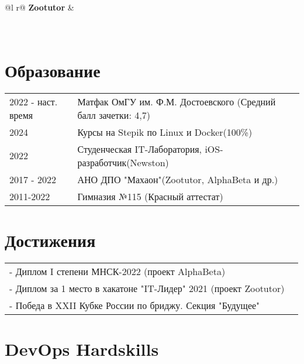 \documentclass[a4paper,12pt]{article}
\begin{document}
\begin{tabularx}{\linewidth}{ @{}l r@{} }
{\textbf{Zootutor}} & \hfill \\[3.75pt]
 \\\\
\end{tabularx}

\section{Образование}
\begin{tabularx}{\linewidth}{@{}l X@{}}	
2022 - наст. время & Матфак ОмГУ им. Ф.М. Достоевского \hfill \normalsize (Средний балл зачетки: 4,7) \\
2024 & Курсы на Stepik по Linux и Docker\hfill (100\%)\\
2022 & Студенческая IT-Лаборатория, iOS-разработчик\hfill (Newston)\\
2017 - 2022 & АНО ДПО "Махаон"\hfill(Zootutor, AlphaBeta и др.) \\ 
2011-2022 & Гимназия №115 \hfill  (Красный аттестат) \\
\end{tabularx}

\section{Достижения}
\begin{tabularx}{\linewidth}{@{}l X@{}}	
- Диплом I степени МНСК-2022 (проект AlphaBeta) \hfill \normalsize  \\
- Диплом за 1 место в хакатоне "IT-Лидер" 2021 (проект Zootutor)\\
- Победа в XXII Кубке России по бриджу. Секция "Будущее" \hfill  \\
\end{tabularx}
\section{DevOps Hardskills}
\end{document}
